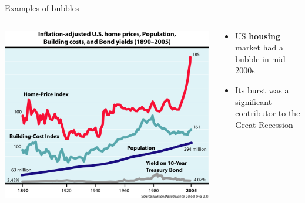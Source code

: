 \documentclass[english,10pt
,aspectratio=169
]{beamer}
\begin{document}
\begin{frame}{Examples of bubbles}
	\begin{columns}
		\begin{column}{0.55\linewidth}
			\center
			\includegraphics[width=0.95\linewidth]{pics/housing}
		\end{column}
		\begin{column}{0.45\linewidth}
			\begin{itemize}
				\item US \textbf{housing} market had a bubble in mid-2000s
				\item Its burst was a significant contributor to the Great Recession
			\end{itemize}
		\end{column}
	\end{columns}
\end{frame}
\end{document}
